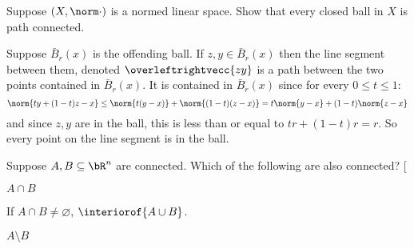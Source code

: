 \documentclass[10pt]{article}
\makeatletter
\def\@blist[#1]{%
    \bgroup\bgroup\par\vskip-\medskipamount%
    \gdef\item{%
        \par\egroup\bgroup\medskip\setbox0=\hbox{#1\quad}%
        \advance\leftskip by \wd0\leavevmode\kern-\wd0\box0%
    }%
}
\def\blist{\@ifnextchar[ \@blist {\@blist[$\bullet$]}}
\def\elist{\par\egroup\egroup\medskip}
\makeatother
\begin{document}
\begin{exercise*}

    Suppose $(X,\norm\cdot)$ is a normed linear space.
    Show that every closed ball in $X$ is path connected.

\end{exercise*}

\let\lineseg=\overleftrightvecc
\begin{blankpp}

    Suppose $\bar B_r(x)$ is the offending ball.
    If $z,y\in\bar B_r(x)$ then the line segment between them, denoted $\lineseg{zy}$ is a path between the two points contained in $\bar B_r(x)$.
    It is contained in $\bar B_r(x)$ since for every $0\leq t\leq1$:
    \[ \norm{ty + (1-t)z - x} \leq \norm{t(y-x)} + \norm{(1-t)(z-x)} = t\norm{y-x} + (1-t)\norm{z-x} \]
    and since $z,y$ are in the ball, this is less than or equal to $tr+(1-t)r=r$.
    So every point on the line segment is in the ball.

\end{blankpp}

\newpage
\begin{exercise*}

    Suppose $A,B\subseteq\bR^n$ are connected.
    Which of the following are also connected?
    \blist
        \item $A\cap B$
        \item If $A\cap B\neq\varnothing$, $\interiorof{A\cup B}$.
        \item $A\setminus B$
    \elist

\end{exercise*}
\end{document}
